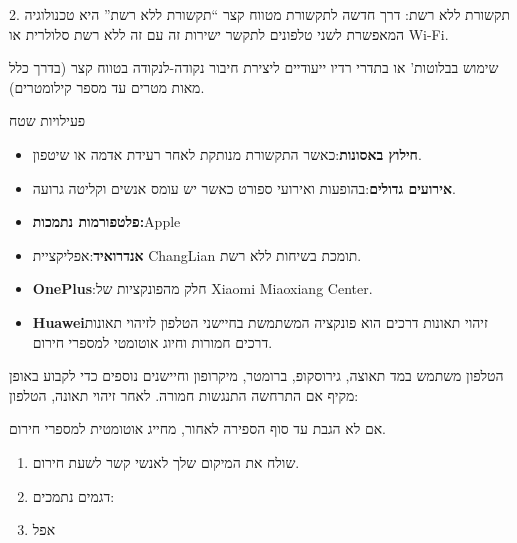 \begin{tcbinfo}{2. תקשורת ללא רשת: דרך חדשה לתקשורת מטווח קצר}
“תקשורת ללא רשת” היא טכנולוגיה המאפשרת לשני טלפונים לתקשר ישירות זה עם זה ללא רשת סלולרית או Wi-Fi.

\end{tcbinfo}


שימוש בבלוטות' או בתדרי רדיו ייעודיים ליצירת חיבור נקודה-לנקודה בטווח קצר (בדרך כלל מאות מטרים עד מספר קילומטרים).


פעילויות שטח


\begin{itemize}
  \item \textbf{חילוץ באסונות}:כאשר התקשורת מנותקת לאחר רעידת אדמה או שיטפון.
  \item \textbf{אירועים גדולים}:בהופעות ואירועי ספורט כאשר יש עומס אנשים וקליטה גרועה.
  \item \textbf{פלטפורמות נתמכות:}Apple
\end{itemize}


\begin{itemize}
  \item \textbf{אנדרואיד}:אפליקציית ChangLian תומכת בשיחות ללא רשת.
  \item \textbf{OnePlus}:חלק מהפונקציות של Xiaomi Miaoxiang Center.
  \item \textbf{Huawei}זיהוי תאונות דרכים הוא פונקציה המשתמשת בחיישני הטלפון לזיהוי תאונות דרכים חמורות וחיוג אוטומטי למספרי חירום.
\end{itemize}


הטלפון משתמש במד תאוצה, גירוסקופ, ברומטר, מיקרופון וחיישנים נוספים כדי לקבוע באופן מקיף אם התרחשה התנגשות חמורה. לאחר זיהוי תאונה, הטלפון:


אם לא הגבת עד סוף הספירה לאחור, מחייג אוטומטית למספרי חירום.

\begin{enumerate}
  \item שולח את המיקום שלך לאנשי קשר לשעת חירום.
  \item דגמים נתמכים:
  \item אפל
\end{enumerate}

